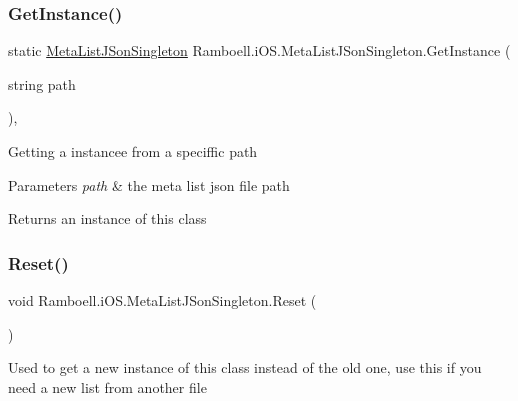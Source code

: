 \subsubsection{\texorpdfstring{Get\+Instance()}{GetInstance()}}
{\footnotesize\ttfamily static \hyperlink{class_ramboell_1_1i_o_s_1_1_meta_list_j_son_singleton}{Meta\+List\+J\+Son\+Singleton} Ramboell.\+i\+O\+S.\+Meta\+List\+J\+Son\+Singleton.\+Get\+Instance (\begin{DoxyParamCaption}\item[{string}]{path }\end{DoxyParamCaption})\hspace{0.3cm}{\ttfamily [inline]}, {\ttfamily [static]}}



Getting a instancee from a speciffic path 


\begin{DoxyParams}{Parameters}
{\em path} & the meta list json file path\\
\hline
\end{DoxyParams}
\begin{DoxyReturn}{Returns}
an instance of this class
\end{DoxyReturn}
\mbox{\label{class_ramboell_1_1i_o_s_1_1_meta_list_j_son_singleton_a515bd2adaadc63f39c96b329074bf390}} 
\subsubsection{\texorpdfstring{Reset()}{Reset()}}
{\footnotesize\ttfamily void Ramboell.\+i\+O\+S.\+Meta\+List\+J\+Son\+Singleton.\+Reset (\begin{DoxyParamCaption}{ }\end{DoxyParamCaption})\hspace{0.3cm}{\ttfamily [inline]}}



Used to get a new instance of this class instead of the old one, use this if you need a new list from another file 

\mbox{\label{class_ramboell_1_1i_o_s_1_1_meta_list_j_son_singleton_a4e654af0774fd51b8509bbcba9376a8c}} 
